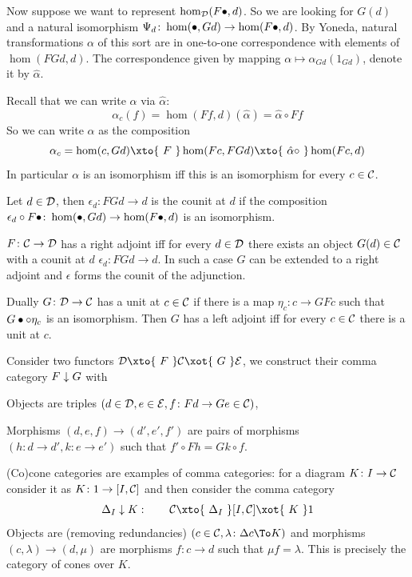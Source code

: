 \eproof

Now suppose we want to represent $\hom_{{\cal D}}(F\bullet,d)$.
So we are looking for $G(d)$ and a natural isomorphism $\Psi_d\colon\hom(\bullet,Gd)\to\hom(F\bullet,d)$.
By Yoneda, natural transformations $\alpha$ of this sort are in one-to-one correspondence with elements of $\hom(FGd,d)$.
The correspondence given by mapping $\alpha\mapsto\alpha_{Gd}(1_{Gd})$, denote it by $\hat\alpha$.

Recall that we can write $\alpha$ via $\hat\alpha$:
$$ \alpha_c(f) = \hom(Ff,d)(\hat\alpha) = \hat\alpha\circ Ff $$
So we can write $\alpha$ as the composition
$$ \alpha_c = \hom(c,Gd) \xto{\ F\ }\hom(Fc,FGd)\xto{\ \hat\alpha\circ\ }\hom(Fc,d) $$
In particular $\alpha$ is an isomorphism iff this is an isomorphism for every $c\in{{\cal C}}$.

\bdefn

    Let $d\in{{\cal D}}$, then $\epsilon_d\colon FGd\to d$ is the {\emphcolor counit at $d$} if the composition $\epsilon_d\circ F\bullet\colon\hom(\bullet,Gd)\to\hom(F\bullet,d)$ is an isomorphism.

\edefn

\bthrm

    $F\colon{{\cal C}}\to{{\cal D}}$ has a right adjoint iff for every $d\in{{\cal D}}$ there exists an object $G(d)\in{{\cal C}}$ with a counit at $d$ $\epsilon_d\colon FGd\to d$.
    In such a case $G$ can be extended to a right adjoint and $\epsilon$ forms the counit of the adjunction.

\ethrm

Dually $G\colon{{\cal D}}\to{{\cal C}}$ has a unit at $c\in{{\cal C}}$ if there is a map $\eta_c\colon c\to GFc$ such that $G\bullet\circ\eta_c$ is an isomorphism.
Then $G$ has a left adjoint iff for every $c\in{{\cal C}}$ there is a unit at $c$.

\bdefn

    Consider two functors $\D\xto{\ F\ }\C\xot{\ G\ }\E$, we construct their {\emphcolor comma category} $F\downarrow G$ with
    \benum
        \item Objects are triples $(d\in{{\cal D}},e\in{{\cal E}},f\colon Fd\to Ge\in{{\cal C}})$,
        \item Morphisms $(d,e,f)\to(d',e',f')$ are pairs of morphisms $(h\colon d\to d',k\colon e\to e')$ such that $f'\circ Fh=Gk\circ f$.
    \eenum

\edefn

(Co)cone categories are examples of comma categories: for a diagram $K\colon I\to{{\cal C}}$ consider it as $K\colon1\to[I,{{\cal C}}]$ and then consider the comma category
$$ \Delta_I\down K:\qquad \C\xto{\ \Delta_I\ }\relax[I,\C]\xot{\ K\ }1 $$
Objects are (removing redundancies) $(c\in\C,\lambda\colon\Delta c\To K)$ and morphisms $(c,\lambda)\to(d,\mu)$ are morphisms $f\colon c\to d$ such that $\mu f=\lambda$.
This is precisely the category of cones over $K$.

